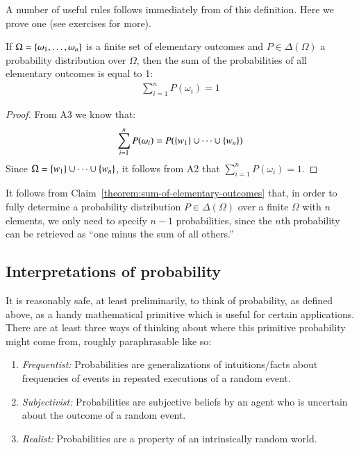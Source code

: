 \documentclass[nobib,nofonts]{tufte-handout}
\renewcommand{\markdef}[1]{\emph{#1}}
\begin{document}
A number of useful rules follows immediately from of this definition.
Here we prove one (see exercises for more).

\begin{claim}
  \label{theorem:sum-of-elementary-outcomes}
  If $\Omega = \left\{\omega_{1}, \dots, \omega_{n}\right\}$ is a finite set of elementary outcomes and $P \in \Delta(\Omega)$ a probability distribution over $\Omega$, then the sum of the probabilities of all elementary outcomes is equal to 1:
  \begin{align*}
    \sum_{i = 1}^{n} P(\omega_{i}) = 1
  \end{align*}
\end{claim}
\begin{proof}
  From A3 we know that:
  \begin{align*}
  \sum_{i = 1}^{n} P(\omega_{i}) = P(\left\{w_{1}\right\} \cup \dots \cup \left\{w_{n}\right\})
  \end{align*}
  Since $\Omega = \left\{w_{1}\right\} \cup \dots \cup \left\{w_{n}\right\}$, it follows from A2 that $\sum_{i = 1}^{n} P(\omega_{i}) = 1$.
\end{proof}

It follows from Claim~\ref{theorem:sum-of-elementary-outcomes} that, in order to fully determine a probability distribution $P \in \Delta(\Omega)$ over a finite $\Omega$ with $n$ elements, we only need to specify $n-1$ probabilities, since the $n$th probability can be retrieved as ``one minus the sum of all others.''

\subsection{Interpretations of probability}

It is reasonably safe, at least preliminarily, to think of probability, as defined above, as a
handy mathematical primitive which is useful for certain applications. There are at least three
ways of thinking about where this primitive probability might come from, roughly paraphrasable
like so:
\begin{enumerate}[1.]
\item \markdef{Frequentist:} Probabilities are generalizations of intuitions/facts about frequencies of events in
  repeated executions of a random event.
\item \markdef{Subjectivist:} Probabilities are subjective beliefs by an agent who is
  uncertain about the outcome of a random event.
\item \markdef{Realist:} Probabilities are a property of an intrinsically random world.
\end{enumerate}
\end{document}
